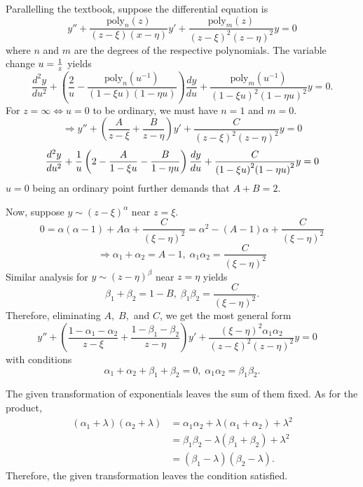 \item

Parallelling the textbook, suppose the differential equation is
\[
    y'' + \frac{\textrm{poly}_n(z)}{(z - \xi)(x - \eta)} y'
    + \frac{\textrm{poly}_m (z)}{{(z - \xi)}^2 {(z - \eta)}^2} y = 0
\]
where $n$ and $m$ are the degrees of the respective polynomials.
The variable change $u = \frac{1}{z}$ yields
\[
    \frac{d^2 y}{du^2}
    + \left(
        \frac{2}{u} - \frac{
            \textrm{poly}_n \left( u^{-1} \right)
        }{(1 - \xi u) (1 - \eta u)}
    \right) \frac{dy}{du}
    + \frac{\textrm{poly}_m \left( u^{-1} \right)}{{(1 - \xi u)}^2 {(1 - \eta u)}^2} y
    = 0.
\]
For $z = \infty \Leftrightarrow u = 0$ to be ordinary, we must have $n = 1$ and $m = 0$.
\[
    \Rightarrow y''
    + \left( \frac{A}{z - \xi} + \frac{B}{z - \eta} \right) y'
    + \frac{C}{{(z - \xi)}^2 {(z - \eta)}^2} y
    = 0
\]
\[
    \frac{d^2 y}{du^2}
    + \frac{1}{u} \left(
        2 - \frac{A}{1 - \xi u} - \frac{B}{1 - \eta u}
    \right) \frac{dy}{du}
    + \frac{C}{{(1 - \xi u)}^2 {(1 - \eta u)}^2} y
    = 0
\]
$u = 0$ being an ordinary point further demands that $A + B = 2$.

Now, suppose $y \sim {(z - \xi)}^\alpha$ near $z = \xi$.
\[
    0
    = \alpha (\alpha - 1) + A \alpha + \frac{C}{{(\xi - \eta)}^2}
    = \alpha^2 - (A - 1) \alpha + \frac{C}{{(\xi - \eta)}^2}
\]
\[
    \Rightarrow \alpha_1 + \alpha_2 = A - 1,\;
    \alpha_1 \alpha_2 = \frac{C}{{(\xi - \eta)}^2}
\]
Similar analysis for $y \sim {(z - \eta)}^\beta$ near $z = \eta$ yields
\[
    \beta_1 + \beta_2 = 1 - B,\;
    \beta_1 \beta_2 = \frac{C}{{(\xi - \eta)}^2}.
\]
Therefore, eliminating $A,\; B,$ and $C$, we get the most general form
\[
    y'' + \left(
        \frac{1 - \alpha_1 - \alpha_2}{z - \xi}
        + \frac{1 - \beta_1 - \beta_2}{z - \eta}
    \right) y' + \frac{{(\xi - \eta)}^2 \alpha_1 \alpha_2}{
        {(z - \xi)}^2 {(z - \eta)}^2
    } y = 0 \quad
\]
with conditions
\[
    \alpha_1 + \alpha_2 + \beta_1 + \beta_2 = 0,\;
    \alpha_1 \alpha_2 = \beta_1 \beta_2.
\]

The given transformation of exponentials leaves the sum of them fixed.
As for the product,
\begin{align*}
    (\alpha_1 + \lambda) (\alpha_2 + \lambda)
    &= \alpha_1 \alpha_2 + \lambda (\alpha_1 + \alpha_2) + \lambda^2 \\
    &= \beta_1 \beta_2 - \lambda (\beta_1 + \beta_2) + \lambda^2 \\
    &= (\beta_1 - \lambda) (\beta_2 - \lambda).
\end{align*}
Therefore, the given transformation leaves the condition satisfied.
